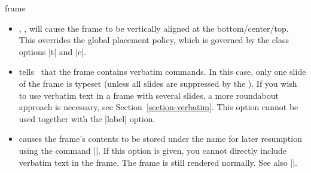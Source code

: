 \begin{environment}{{frame}%
    }
\begin{frame}[<+->][plain]
\begin{frame}[plain]
\begin{itemize}
    The use of this  option \emph{evil}. In a (good) presentation you
    prepare each slide carefully and think twice before putting something
    on a certain slide rather than on some different slide. Using the
    |allowframebreaks| option invites the creation of horrible, endless
    presentations that resemble more a ``paper projected on the wall''
    than a presentation. Nevertheless, the option does have its
    uses. Most noticably, it can be convenient for automatically
    splitting bibliographies or long equations.

    \example
\begin{verbatim}
\begin{frame}[allowframebreaks]
  \frametitle{References}

  \begin{thebibliography}{XX}

  \bibitem...
  \bibitem...
    ...
  \bibitem...
  \end{thebibliography}
\end{frame}
\end{verbatim}
    \example
\begin{verbatim}
\begin{frame}[allowframebreaks,allowdisplaybreaks]
  \frametitle{A Long Equation}

  \begin{align}
    \zeta(2) &= 1 + 1/4 + 1/9 + \cdots \\
    &= ... \\
    ...
    &= \pi^2/6.
  \end{align}
\end{frame}
\end{verbatim}
  \item
    , ,  will cause the frame
    to be vertically aligned at the bottom/center/top. This overrides
    the global placement policy, which is governed by the class
    options |t| and |c|.
  \item
     tells \beamer\ that the frame
    contains verbatim commands. In this case, only one slide of
    the frame is typeset (unless all slides are suppressed by the
    ). If you wish to use verbatim text in
    a frame with several slides, a more roundabout approach is
    necessary, see Section~\ref{section-verbatim}. This option cannot
    be used together with the |label| option.
    
  \item
     causes the frame's contents to
    be stored under the name  for later resumption using
    the command |\againframe|. If this option is given, you cannot
    directly include verbatim text in the frame. The frame is still rendered
    normally. See also |\againframe|.


\end{itemize}
\end{frame}
\end{frame}
\end{environment}
